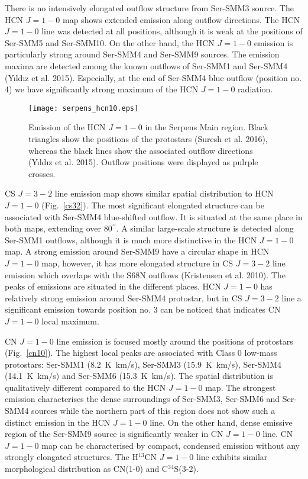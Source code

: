 \documentclass{aa}
\begin{document}
There is no intensively elongated outflow structure from Ser-SMM3 source. The HCN $J=1-0$ map shows extended emission along outflow directions. The HCN $J=1-0$ line was detected at all positions, although it is weak at the positions of Ser-SMM5 and Ser-SMM10. On the other hand, the HCN $J=1-0$ emission is particularly strong around Ser-SMM4 and Ser-SMM9 sources. The emission maxima are detected among the known outflows of Ser-SMM1 and Ser-SMM4 (Y{\i}ld{\i}z et al. 2015). Especially, at the end of Ser-SMM4 blue outflow (position no. 4) we have significantly strong maximum of the HCN $J=1-0$ radiation. 

\begin{figure}
   \centering
   \texttt{[image: serpens\_hcn10.eps]}
      \caption{Emission of the HCN $J=1-0$ in the Serpens Main region. Black triangles show the positions of the protostars (Suresh et al. 2016), whereas the black lines show the associated outflow directions (Y{\i}ld{\i}z et al. 2015). Outflow positions were displayed as pulrple crosses.}
         \label{hcn10}
   \end{figure}

CS $J=3-2$ line emission map shows similar spatial distribution to HCN $J=1-0$ (Fig.~\ref{cs32}). The most significant elongated structure can be associated with Ser-SMM4 blue-shifted outflow. It is situated at the same place in both maps, extending over 80$^{\prime\prime}$. A similar large-scale structure is detected along Ser-SMM1 outflows, although it is much more distinctive in the HCN $J=1-0$ map. A strong emission around Ser-SMM9 have a circular shape in HCN $J=1-0$ map, however, it has more elongated structure in CS $J=3-2$ line emission which overlaps with the S68N outflows (Kristensen et al. 2010). The peaks of emissions are situated in the different places. HCN $J=1-0$ has relatively strong emission around Ser-SMM4 protostar, but in CS $J=3-2$ line a significant emission towards position no. 3 can be noticed that indicates CN $J=1-0$ local maximum. 

CN $J=1-0$ line emission is focused mostly around the positions of protostars (Fig.~\ref{cn10}). 
The highest local peaks are associated with Class 0 low-mass protostars: Ser-SMM1 (8.2~K~km/s), Ser-SMM3 (15.9~K~km/s), Ser-SMM4 (14.1~K~km/s) and Ser-SMM6 (15.3~K~km/s). The spatial distribution is qualitatively different compared to the HCN $J=1-0$ map. The strongest emission characterises the dense surroundings of Ser-SMM3, Ser-SMM6 and Ser-SMM4 sources while the northern part of this region does not show such a distinct emission in the HCN $J=1-0$ line. On the other hand, dense emissive region of the Ser-SMM9 source is significantly weaker in CN $J=1-0$ line. CN $J=1-0$ map can be characterised by compact, condensed emission without any strongly elongated structures. The H$^{13}$CN $J=1-0$ line exhibits similar morphological distribution as CN(1-0) and \mbox{C$^{34}$S(3-2)}. 
\end{document}
